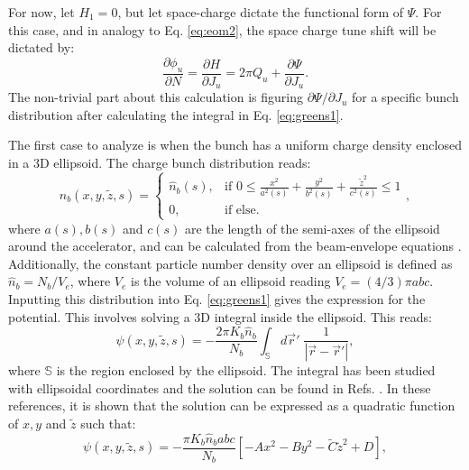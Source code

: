 For now, let $H_1=0$, but let space-charge dictate the functional form of $\Psi$. For this case, and in analogy to Eq. \ref{eq:eom2}, the space charge tune shift will be dictated by:
\begin{equation}
    \label{eq:eompsi}
    \frac{\partial \phi_u}{\partial N} = \frac{\partial H}{\partial J_u} = 2\pi Q_u + \frac{\partial \Psi}{\partial J_u}.
\end{equation}
The non-trivial part about this calculation is figuring ${\partial \Psi}/{\partial J_u}$ for a specific bunch distribution after calculating the integral in Eq. \ref{eq:greens1}.

The first case to analyze is when the bunch has a uniform charge density enclosed in a 3D ellipsoid. The charge bunch distribution reads:
\begin{equation}
    \label{eq:dist}
    n_b(x,y,\tilde{z},s) = \left\{
        \begin{array}{cc} 
            \hat{n}_b(s), & \text{if  } 0 \leq \frac{x^2}{a^2(s)} + \frac{y^2}{b^2(s)} + \frac{\tilde{z}^2}{c^2(s)} \leq 1\\
            0, & \text{if else.}
        \end{array} 
    \right.,
\end{equation}
where $a(s),b(s)$ and $c(s)$ are the length of the semi-axes of the ellipsoid around the accelerator, and can be calculated from the beam-envelope equations \cite{witchcraft}. Additionally, the constant particle number density over an ellipsoid is defined as $\hat{n}_b=N_b/V_e$, where $V_e$ is the volume of an ellipsoid reading $V_e=(4/3) \pi abc$. Inputting this distribution into Eq. \ref{eq:greens1} gives the expression for the potential. This involves solving a 3D integral inside the ellipsoid. This reads:
\begin{equation}
    \label{eq:potential1}
    \psi(x,y,\tilde{z},s)=-\frac{2 \pi K_b \hat{n}_b}{N_b} \int_{\mathbb{S}} d\vec{r}' \; \frac{1}{\left| \vec{r}-\vec{r}' \right|},
\end{equation} 
where $\mathbb{S}$ is the region enclosed by the ellipsoid. The integral has been studied with ellipsoidal coordinates and the solution can be found in Refs. \cite{Kellog_1967, witchcraft}. In these references, it is shown that the solution can be expressed as a quadratic function of $x,y$ and $\tilde{z}$ such that:
\begin{equation}
    \label{eq:potential2}
    \psi(x,y,\tilde{z},s)=-\frac{\pi K_b \hat{n}_b a b c }{N_b} \left[ -A x^2 -B y^2 - \tilde{C} \tilde{z}^2 +D \right],
\end{equation}
